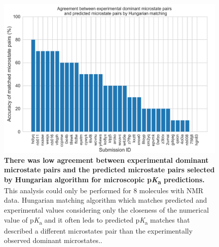 \documentclass[9pt,lineno,final]{elife}
\newcommand{\pKa}{p\textit{K}\textsubscript{a}}
\begin{document}
\begin{figure}
\centering
\includegraphics[width=0.75\linewidth]{figures/TypeI_Hungarian_match_microstate_pair_accuracy.pdf}
\caption{ {\bf There was low agreement between experimental dominant microstate pairs and the predicted microstate pairs selected by Hungarian algorithm for microscopic \pKa{} predictions.} This analysis could only be performed for 8 molecules with NMR data. Hungarian matching algorithm which matches predicted and experimental values considering only the closeness of the numerical value of \pKa{} and it often leds to predicted \pKa{} matches that described a different microstates pair than the experimentally observed dominant microstates..
}
\label{fig:microstate-pairs-with-Hungarian-match-vs-experiments}
\end{figure}
\end{document}
